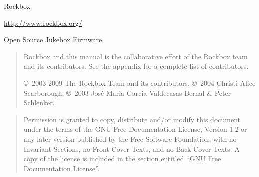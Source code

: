 %
%
%
%
%
\ifpdfoutput{
\newcommand{\latexbuild}{pdf\LaTeX}}
{\newcommand{\latexbuild}{\TeX4ht}}

%
{\begin{center}{\Large{Rockbox}}\end{center}}

\vspace{1cm}
\noindent
\begin{center}
\url{http://www.rockbox.org/}

\noindent
Open Source Jukebox Firmware
\end{center}

\vspace{6cm}
\begin{quote}
Rockbox and this manual is the collaborative effort of the
Rockbox team and its contributors. See the appendix for a complete list of
contributors.

\copyright~2003-2009 The Rockbox Team and its contributors,
\copyright~2004 Christi Alice Scarborough,
\copyright~2003 Jos\'{e} Maria Garcia-Valdecasas Bernal \& Peter Schlenker.
\end{quote}
\vspace{3mm}
\begin{center}
\end{center}

\vspace{\fill}
\begin{quote}
  Permission is granted to copy, distribute and/or modify this document
  under the terms of the GNU Free Documentation License, Version 1.2
  or any later version published by the Free Software Foundation;
  with no Invariant Sections, no Front-Cover Texts, and no Back-Cover Texts.
  A copy of the license is included in the section entitled ``GNU
  Free Documentation License''.
\end{quote}


